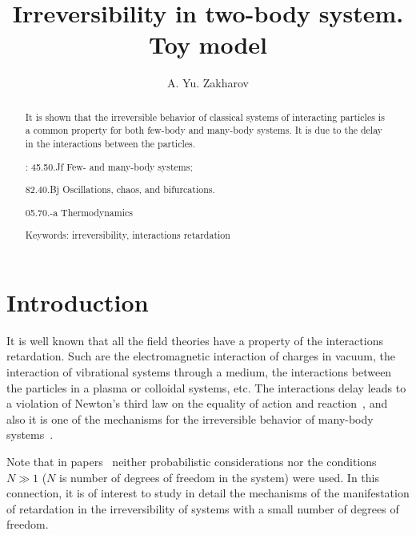 \documentclass[a4,%
amsmath,amssymb,
12pt
]{revtex4-1}
\begin{document}
	
	\title{Irreversibility in two-body system. Toy model} 
	
	\author{A. Yu. Zakharov} 
	
	
	\begin{abstract}
		It is shown that the irreversible behavior of classical systems of interacting particles is a common property for both few-body and many-body systems. It is due to the delay in the interactions between the particles.
		
		\pacs: 45.50.Jf Few- and many-body systems; 
		
		82.40.Bj Oscillations, chaos, and bifurcations. 
		
		05.70.-a Thermodynamics
		
		
		Keywords: {irreversibility, interactions retardation}
		
	\end{abstract}
	\maketitle
	

\section{Introduction}

It is well known that all the field theories have a property of the interactions retardation. Such are the electromagnetic interaction of charges in vacuum, the interaction of vibrational systems through a medium, the interactions between the particles in a plasma or colloidal systems, etc. The interactions delay leads to a violation of Newton's third law on the equality of action and reaction~\cite {Ivlev}, and also it is one of the mechanisms for the irreversible behavior of many-body systems~\cite{Zakh2,Zakh3}. 

Note that in papers~\cite{Zakh2,Zakh3} neither probabilistic considerations nor the conditions $N \gg 1$ ($N$ is number of degrees of freedom in the system) were used. In this connection, it is of interest to study in detail the mechanisms of the manifestation of retardation in the irreversibility of systems with a small number of degrees of freedom.
\end{document}
